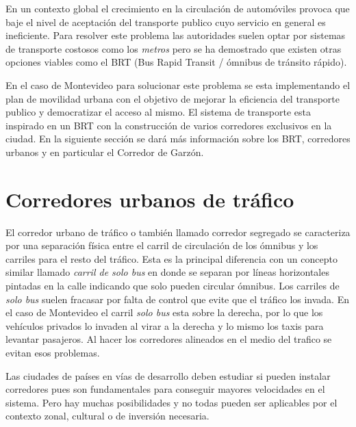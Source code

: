En un contexto global el crecimiento en la circulación de automóviles provoca que baje el nivel de aceptación del transporte publico cuyo servicio en general es ineficiente. Para resolver este problema las autoridades suelen optar por sistemas de transporte costosos como los \emph{metros} pero se ha demostrado que existen otras opciones viables como el BRT (Bus Rapid Transit / ómnibus de tránsito rápido)\citep{BRT_Dial}.

En el caso de Montevideo para solucionar este problema se esta implementando el plan de movilidad urbana \citep{PlanMovilidad} con el objetivo de mejorar la eficiencia del transporte publico y democratizar el acceso al mismo. El sistema de transporte esta inspirado en un BRT con la construcción de varios corredores exclusivos en la ciudad. En la siguiente sección se dará más información sobre los BRT, corredores urbanos y en particular el Corredor de Garzón.



\section{Corredores urbanos de tráfico}

El corredor urbano de tráfico o también llamado corredor segregado se caracteriza por una separación física entre el carril de circulación de los ómnibus y los carriles para el resto del tráfico. 
Esta es la principal diferencia con un concepto similar llamado \emph{carril de solo bus} en donde se separan por líneas horizontales pintadas en la calle indicando que solo pueden circular ómnibus. Los carriles de \emph{solo bus} suelen fracasar por falta de control que evite que el tráfico los invada. En el caso de Montevideo el carril \emph{solo bus} esta sobre la derecha, por lo que los vehículos privados lo invaden al virar a la derecha y lo mismo los taxis para levantar pasajeros. Al hacer los corredores alineados en el medio del trafico se evitan esos problemas.  

Las ciudades de países en vías de desarrollo deben estudiar si pueden instalar corredores pues son fundamentales para conseguir mayores velocidades en el sistema. Pero hay muchas posibilidades y no todas pueden ser aplicables por el contexto zonal, cultural o de inversión necesaria.

